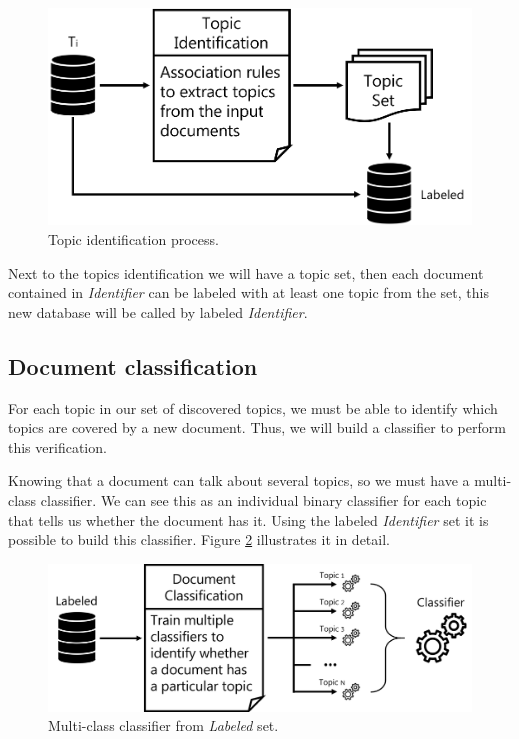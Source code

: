 \begin{figure}[h!]
	\centering
	\includegraphics[width=0.7\linewidth]{01.Chapters/04.Materials/topic-identification}
	\caption{Topic identification process.}
	\label{fig:topic-identification}
\end{figure}

Next to the topics identification we will have a topic set, then each document contained in \textit{Identifier} can be labeled with at least one topic from the set, this new database will be called by labeled \textit{Identifier}.

\subsection{Document classification}

For each topic in our set of discovered topics, we must be able to identify which topics are covered by a new document. Thus, we will build a classifier to perform this verification.

Knowing that a document can talk about several topics, so we must have a multi-class classifier. We can see this as an individual binary classifier for each topic that tells us whether the document has it. Using the labeled \textit{Identifier} set it is possible to build this classifier. Figure \ref{fig:document-classification} illustrates it in detail.

\begin{figure}[h!]
	\centering
	\includegraphics[width=0.8\linewidth]{01.Chapters/04.Materials/document-classification}
	\caption{Multi-class classifier from \textit{Labeled} set.}
	\label{fig:document-classification}
\end{figure}

